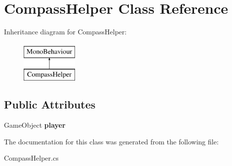 \hypertarget{class_compass_helper}{}\section{Compass\+Helper Class Reference}
\label{class_compass_helper}
Inheritance diagram for Compass\+Helper\+:\begin{figure}[H]
\begin{center}
\leavevmode
\includegraphics[height=2.000000cm]{class_compass_helper}
\end{center}
\end{figure}
\subsection*{Public Attributes}
\begin{DoxyCompactItemize}
\item 
\mbox{\label{class_compass_helper_af5db9bcc613ae5e5086781336b9f8d75}} 
Game\+Object {\bfseries player}
\end{DoxyCompactItemize}


The documentation for this class was generated from the following file\+:\begin{DoxyCompactItemize}
\item 
Compass\+Helper.\+cs\end{DoxyCompactItemize}
